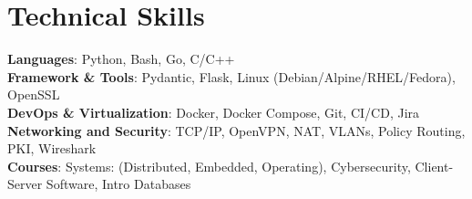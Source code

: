 \documentclass[letterpaper,11pt]{article}
\begin{document}
\section{Technical Skills}
 \begin{itemize}[leftmargin=0.15in, label={}]
    \small{\item{
     \textbf{Languages}{: Python, Bash, Go, C/C++} \\
     \textbf{Framework \& Tools}{: Pydantic, Flask, Linux (Debian/Alpine/RHEL/Fedora), OpenSSL} \\
     \textbf{DevOps \& Virtualization}{: Docker, Docker Compose, Git, CI/CD, Jira} \\
     \textbf{Networking and Security}{: TCP/IP, OpenVPN, NAT, VLANs, Policy Routing, PKI, Wireshark} \\
     \textbf{Courses}{: Systems: (Distributed, Embedded, Operating), Cybersecurity, Client-Server Software, Intro Databases} \\

    }}
 \end{itemize}
 \vspace{-16pt}

\end{document}
